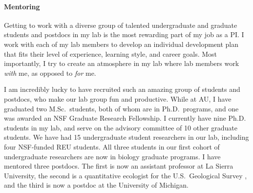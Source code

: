\paragraph*{Mentoring}
Getting to work with a diverse group of talented undergraduate and graduate
students and postdocs in my lab is the most rewarding part of my job as a
PI.
I work with each of my lab members to develop an individual development
plan that fits
their level of experience, learning style, and career goals.
Most importantly, I try to create an atmosphere in my lab where
lab members work \emph{with} me, as opposed to \emph{for} me.

I am incredibly lucky to have recruited such an amazing group of students and
postdocs, who make
our lab group fun and productive.
While at AU, I have graduated two M.Sc.\ students, both of whom are in Ph.D.\
programs, and one was awarded an NSF Graduate Research Fellowship.
I currently have nine Ph.D. students in my lab, and serve on the advisory
committee of 10 other graduate students.
We have had 15 undergraduate student researchers in our lab, including four
NSF-funded REU students.
All three students in our first cohort of undergraduate researchers are now in
biology graduate programs.
I have mentored three postdocs.
The first is now an assistant professor at La Sierra University, the second is
a quantitative ecologist for the U.S.\ Geological Survey , and the third is
now a postdoc at the University of Michigan.
